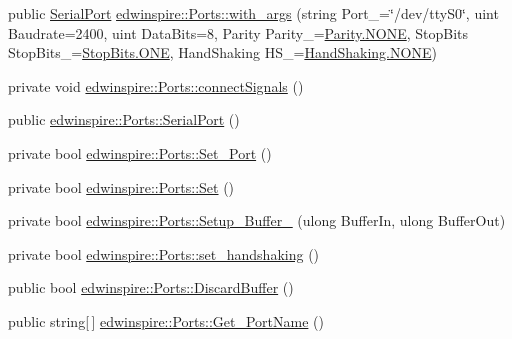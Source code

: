 \begin{DoxyCompactItemize}
public \hyperlink{class_serial_port}{Serial\-Port} \hyperlink{namespaceedwinspire_1_1_ports_a9de2452f18841a5338e2c45fbc8cca2d}{edwinspire\-::\-Ports\-::with\-\_\-args} (string Port\-\_\-=\char`\"{}/dev/tty\-S0\char`\"{}, uint Baudrate=2400, uint Data\-Bits=8, Parity Parity\-\_\-=\hyperlink{enum_8vala_a899caa602e4fff675b17cdbab33607ec}{Parity.\-N\-O\-N\-E}, Stop\-Bits Stop\-Bits\-\_\-=\hyperlink{enum_8vala_a2cb8470634cc90a55800ee95f967eade}{Stop\-Bits.\-O\-N\-E}, Hand\-Shaking H\-S\-\_\-=\hyperlink{enum_8vala_a899caa602e4fff675b17cdbab33607ec}{Hand\-Shaking.\-N\-O\-N\-E})
\item 
private void \hyperlink{namespaceedwinspire_1_1_ports_af8d9afe49636a2f0ba22f1f17bbaba17}{edwinspire\-::\-Ports\-::connect\-Signals} ()
\item 
public \hyperlink{namespaceedwinspire_1_1_ports_a293ef58b4105463e6bd4b2d5ad9b3144}{edwinspire\-::\-Ports\-::\-Serial\-Port} ()
\item 
private bool \hyperlink{namespaceedwinspire_1_1_ports_a17877b618445a0e65f46c94bc80bc821}{edwinspire\-::\-Ports\-::\-Set\-\_\-\-Port} ()
\item 
private bool \hyperlink{namespaceedwinspire_1_1_ports_ab4f5440159397421d6f1985dccda8aa7}{edwinspire\-::\-Ports\-::\-Set} ()
\item 
private bool \hyperlink{namespaceedwinspire_1_1_ports_a7a08c939ddf6ae7e1426b3bd061c3f13}{edwinspire\-::\-Ports\-::\-Setup\-\_\-\-Buffer\-\_\-} (ulong Buffer\-In, ulong Buffer\-Out)
\item 
private bool \hyperlink{namespaceedwinspire_1_1_ports_a16c386569d50ef1f47b43bce24c54cde}{edwinspire\-::\-Ports\-::set\-\_\-handshaking} ()
\item 
public bool \hyperlink{namespaceedwinspire_1_1_ports_ae3a4888c33e46ef2cb9c21475b39747d}{edwinspire\-::\-Ports\-::\-Discard\-Buffer} ()
\item 
public string\mbox{[}$\,$\mbox{]} \hyperlink{namespaceedwinspire_1_1_ports_ab6cd9fa85820a8013aa6f47c89eb8102}{edwinspire\-::\-Ports\-::\-Get\-\_\-\-Port\-Name} ()
\end{DoxyCompactItemize}
